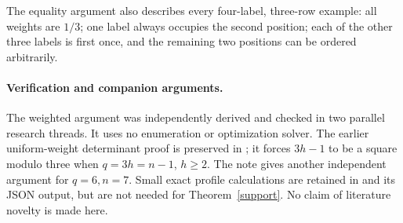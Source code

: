 \documentclass[11pt]{article}
\begin{document}
The equality argument also describes every four-label, three-row
example: all weights are $1/3$; one label always occupies the second
position; each of the other three labels is first once, and the
remaining two positions can be ordered arbitrarily.

\paragraph{Verification and companion arguments.}
The weighted argument was independently derived and checked in two
parallel research threads. It uses no enumeration or optimization
solver. The earlier uniform-weight determinant proof is preserved
in ; it forces
$3h-1$ to be a square modulo three when $q=3h=n-1$, $h\ge2$.
The note  gives another
independent argument for $q=6,n=7$. Small exact profile calculations
are retained in  and its JSON
output, but are not needed for Theorem~\ref{support}.
No claim of literature novelty is made here.
\end{document}
